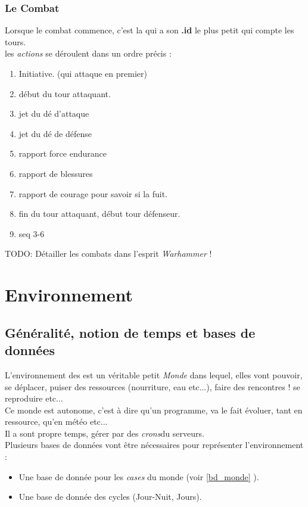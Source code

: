 \documentclass[french]{report}
\newlength{\du}\fi
\begin{document}
\section{Le Combat}
Lorsque le combat commence, c'est la \CoCiX qui a son \textbf{.id} le plus petit qui compte les tours.\\
les \textit{actions} se déroulent dans un ordre précis : \\

\begin{enumerate}
	\item Initiative. (qui attaque en premier)
	\item début du tour attaquant.
	\item jet du dé d'attaque
	\item jet du dé de défense
	\item rapport force endurance
	\item rapport de blessures
	\item rapport de courage pour savoir si la \CoCiX fuit.
	\item fin du tour attaquant, début tour défenseur.
	\item seq 3-6\\
\end{enumerate}

{\large TODO: Détailler les combats dans l'esprit \textit{Warhammer} !}


\newpage
\part{Environnement}\label{environnement}
\chapter{Généralité, notion de temps et bases de données}\label{jour_nuit}

L'environnement des \CoCiX est un véritable petit \textit{Monde} dans lequel, elles vont pouvoir, se déplacer, puiser des ressources (nourriture, eau etc...), faire des rencontres ! se reproduire etc...\\
Ce monde est autonome, c'est à dire qu'un programme, va le fait évoluer, tant en ressource, qu'en météo etc...\\

Il a sont propre temps, gérer par des \textit{crons}\footnotemark[1] du serveurs.\\
Plusieurs bases de données vont être nécessaires pour représenter l'environnement : \\
\begin{itemize}
	\item Une base de donnée pour les \textit{cases} du monde (voir \ref{bd_monde} ).
	\item Une base de donnée des cycles (Jour-Nuit, Jours).\\
\end{itemize}
\end{document}
